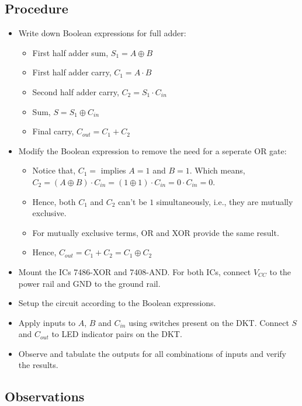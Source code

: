 \documentclass[11pt, a4paper]{article}
\begin{document}
\subsection{Procedure}

\begin{itemize}
    \item Write down Boolean expressions for full adder:
    \begin{itemize}[label=$\circ$]
        \item First half adder sum, $S_1 = A \oplus B$
        \item First half adder carry, $C_1 = A \cdot B$
        \item Second half adder carry, $C_2 = S_1 \cdot C_{in}$
        \item Sum, $S = S_1 \oplus C_{in}$
        \item Final carry, $C_{out} = C_1 + C_2$ \hfill
    \end{itemize}
    \item Modify the Boolean expression to remove the need for a seperate OR gate:
    \begin{itemize}[label=$\circ$]
        \item Notice that, $C_1 =$ implies $A = 1$ and $B = 1$. Which means, $C_2 = (A \oplus B) \cdot C_{in} = (1 \oplus 1) \cdot C_{in} = 0 \cdot C_{in} = 0$.
        \item Hence, both $C_1$ and $C_2$ can't be $1$ simultaneously, i.e., they are mutually exclusive.
        \item For mutually exclusive terms, OR and XOR provide the same result.
        \item Hence, $C_{out} = C_1 + C_2 = C_1 \oplus C_2$
    \end{itemize}
    \item Mount the ICs 7486-XOR and 7408-AND. For both ICs, connect $V_{CC}$ to the power rail and $\text{GND}$ to the ground rail.
    \item Setup the circuit according to the Boolean expressions.
    \item Apply inputs to $A$, $B$ and $C_{in}$ using switches present on the DKT. Connect $S$ and $C_{out}$ to LED indicator pairs on the DKT.
    \item Observe and tabulate the outputs for all combinations of inputs and verify the results.
\end{itemize}

\subsection{Observations}
\end{document}
